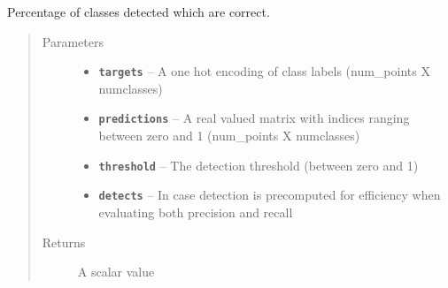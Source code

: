 \documentclass[letterpaper,10pt,english]{sphinxmanual}
\begin{document}
\begin{fulllineitems}
\label{node_ops:node_ops.precision}
Percentage of classes detected which are correct.
\begin{quote}\begin{description}
\item[{Parameters}] \leavevmode\begin{itemize}
\item {} 
\textbf{\texttt{targets}} -- A one hot encoding of class labels (num\_points X numclasses)

\item {} 
\textbf{\texttt{predictions}} -- A real valued matrix with indices ranging between zero and 1 (num\_points X numclasses)

\item {} 
\textbf{\texttt{threshold}} -- The detection threshold (between zero and 1)

\item {} 
\textbf{\texttt{detects}} -- In case detection is precomputed for efficiency when evaluating both precision and recall

\end{itemize}

\item[{Returns}] \leavevmode
A scalar value

\end{description}\end{quote}

\end{fulllineitems}

\end{document}
